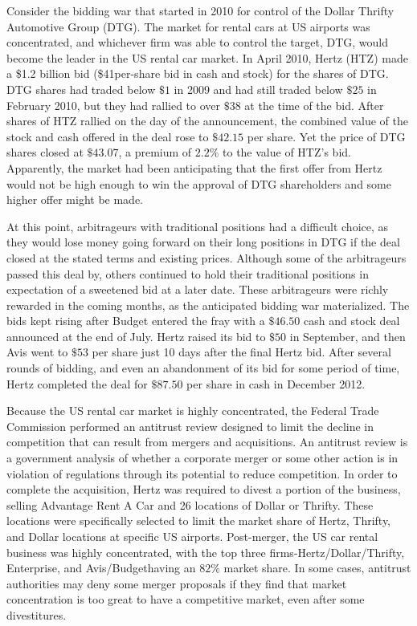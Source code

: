 \documentclass[11pt]{article}
\begin{document}
Consider the bidding war that started in 2010 for control of the Dollar Thrifty Automotive Group (DTG). The market for rental cars at US airports was concentrated, and whichever firm was able to control the target, DTG, would become the leader in the US rental car market. In April 2010, Hertz (HTZ) made a \$1.2 billion bid (\$41per-share bid in cash and stock) for the shares of DTG. DTG shares had traded below $\$ 1$ in 2009 and had still traded below $\$ 25$ in February 2010, but they had rallied to over $\$ 38$ at the time of the bid. After shares of HTZ rallied on the day of the announcement, the combined value of the stock and cash offered in the deal rose to $\$ 42.15$ per share. Yet the price of DTG shares closed at $\$ 43.07$, a premium of $2.2 \%$ to the value of HTZ's bid. Apparently, the market had been anticipating that the first offer from Hertz would not be high enough to win the approval of DTG shareholders and some higher offer might be made.

At this point, arbitrageurs with traditional positions had a difficult choice, as they would lose money going forward on their long positions in DTG if the deal closed at the stated terms and existing prices. Although some of the arbitrageurs passed this deal by, others continued to hold their traditional positions in expectation of a sweetened bid at a later date. These arbitrageurs were richly rewarded in the coming months, as the anticipated bidding war materialized. The bids kept rising after Budget entered the fray with a $\$ 46.50$ cash and stock deal announced at the end of July. Hertz raised its bid to $\$ 50$ in September, and then Avis went to $\$ 53$ per share just 10 days after the final Hertz bid. After several rounds of bidding, and even an abandonment of its bid for some period of time, Hertz completed the deal for $\$ 87.50$ per share in cash in December 2012.

Because the US rental car market is highly concentrated, the Federal Trade Commission performed an antitrust review designed to limit the decline in competition that can result from mergers and acquisitions. An antitrust review is a government analysis of whether a corporate merger or some other action is in violation of regulations through its potential to reduce competition. In order to complete the acquisition, Hertz was required to divest a portion of the business, selling Advantage Rent A Car and 26 locations of Dollar or Thrifty. These locations were specifically selected to limit the market share of Hertz, Thrifty, and Dollar locations at specific US airports. Post-merger, the US car rental business was highly concentrated, with the top three firms-Hertz/Dollar/Thrifty, Enterprise, and Avis/Budgethaving an $82 \%$ market share. In some cases, antitrust authorities may deny some merger proposals if they find that market concentration is too great to have a competitive market, even after some divestitures.
\end{document}
